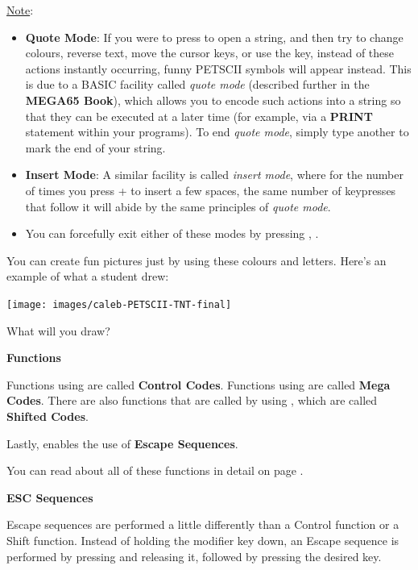 \underline{Note}:
\begin{itemize}
  \item {\bf Quote Mode}: If you were to press  to open a string, and then try to change
colours, reverse text, move the cursor keys, or use the  key, instead
of these actions instantly occurring, funny PETSCII symbols will appear instead. This is
due to a BASIC facility called {\it quote mode} (described further in the \textbf{MEGA65 Book}),
which allows you to encode such actions into a string so that they can be executed at a later
time (for example, via a {\bf PRINT} statement within your programs). To end {\it quote mode}, simply
type another  to mark the end of your string.
  \item {\bf Insert Mode}: A similar facility is called
{\it insert mode}, where for the number of times you press  + 
to insert a few spaces, the same number of keypresses that follow it will abide by the same
principles of {\it quote mode}.
  \item You can forcefully exit either of these modes by pressing , .
\end{itemize}

\needspace{4cm}
You can create fun pictures just by using these colours and letters.  Here's an example of what a student drew:

\begin{center}
\texttt{[image: images/caleb-PETSCII-TNT-final]}
\end{center}

What will you draw?

\needspace{2cm}
\textbf{Functions}

Functions using  are called \textbf{Control Codes}.
Functions using \megasymbolkey are called \textbf{Mega Codes}. There are also functions that are called by using , which
are called \textbf{Shifted Codes}.

Lastly,  enables the use of \textbf{Escape Sequences}.

You can read about all of these functions in detail on page \pageref{appendix:controlcodes}.

\needspace{2cm}
\textbf{ESC Sequences}

Escape sequences are performed a little differently than a Control function or a Shift function. Instead of holding the modifier key down, an Escape sequence is performed by pressing  and releasing it, followed by pressing the desired key.

